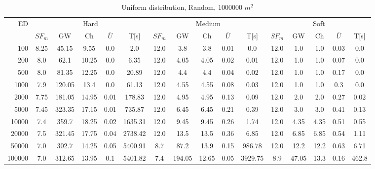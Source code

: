 \begin{table}[htb]
	\centering
	\begin{tabular}{|r|c|c|c|c|c|c|c|c|c|c|c|c|c|c|c|} 
		\hline
		\multirow{2}{*}{ED} & \multicolumn{5}{c|}{Hard} & \multicolumn{5}{c|}{Medium} &\multicolumn{5}{c|}{Soft} \\ 
		\cline{2-16} 
		&$SF_{m}$&GW & Ch & $\overline{U}$&T[s] &$SF_{m}$&GW & Ch & $\overline{U}$ &T[s] &$SF_{m}$&GW & Ch & $\overline{U}$  & T[s]  \\ 
		\hline 
		100 & 8.25 & 45.15 & 9.55 & 0.0 & 2.0 & 12.0 & 3.8 & 3.8 & 0.01 & 0.0 & 12.0 & 1.0 & 1.0 & 0.03 & 0.0\\ 
		200 & 8.0 & 62.1 & 10.25 & 0.0 & 6.35 & 12.0 & 4.05 & 4.05 & 0.02 & 0.01 & 12.0 & 1.0 & 1.0 & 0.07 & 0.0\\ 
		500 & 8.0 & 81.35 & 12.25 & 0.0 & 20.89 & 12.0 & 4.4 & 4.4 & 0.04 & 0.02 & 12.0 & 1.0 & 1.0 & 0.17 & 0.0\\ 
		1000 & 7.9 & 120.05 & 13.4 & 0.0 & 61.13 & 12.0 & 4.55 & 4.55 & 0.08 & 0.03 & 12.0 & 1.0 & 1.0 & 0.3 & 0.0\\ 
		2000 & 7.75 & 181.05 & 14.95 & 0.01 & 178.83 & 12.0 & 4.95 & 4.95 & 0.13 & 0.09 & 12.0 & 2.0 & 2.0 & 0.27 & 0.02\\ 
		5000 & 7.45 & 323.35 & 17.15 & 0.01 & 735.87 & 12.0 & 6.45 & 6.45 & 0.21 & 0.39 & 12.0 & 3.0 & 3.0 & 0.41 & 0.13\\ 
		10000 & 7.4 & 359.7 & 18.25 & 0.02 & 1635.31 & 12.0 & 9.45 & 9.45 & 0.26 & 1.74 & 12.0 & 4.35 & 4.35 & 0.51 & 0.55\\ 
		20000 & 7.5 & 321.45 & 17.75 & 0.04 & 2738.42 & 12.0 & 13.5 & 13.5 & 0.36 & 6.85 & 12.0 & 6.85 & 6.85 & 0.54 & 1.11\\ 
		50000 & 7.0 & 302.7 & 14.25 & 0.05 & 5400.91 & 8.7 & 87.2 & 13.9 & 0.15 & 986.78 & 12.0 & 12.2 & 12.2 & 0.63 & 6.71\\ 
		100000 & 7.0 & 312.65 & 13.95 & 0.1 & 5401.82 & 7.4 & 194.05 & 12.65 & 0.05 & 3929.75 & 8.9 & 47.05 & 13.3 & 0.16 & 462.8\\ 
		\hline 
	\end{tabular} 
	\caption{Uniform distribution, Random, 1000000 $m^2$} 
	\label{tab:UnRandom1000} 
\end{table} 
